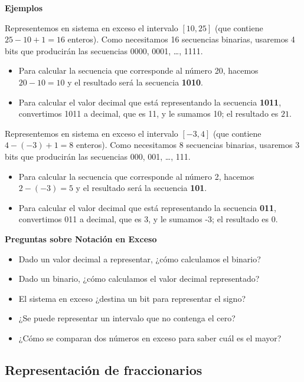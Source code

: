 \documentclass[spanish,a4paper,]{article}
\providecommand{\tightlist}{%
  \setlength{\itemsep}{0pt}\setlength{\parskip}{0pt}}
\begin{document}
\textbf{Ejemplos}

Representemos en sistema en exceso el intervalo \([10, 25]\) (que
contiene \(25 - 10 + 1 = 16\) enteros). Como necesitamos 16 secuencias
binarias, usaremos 4 bits que producirán las secuencias 0000, 0001,
\ldots{}, 1111.

\begin{itemize}
\tightlist
\item
  Para calcular la secuencia que corresponde al número 20, hacemos
  \(20 - 10 = 10\) y el resultado será la secuencia \textbf{1010}.
\item
  Para calcular el valor decimal que está representando la secuencia
  \textbf{1011}, convertimos 1011 a decimal, que es 11, y le sumamos 10;
  el resultado es \(21\).
\end{itemize}

Representemos en sistema en exceso el intervalo \([-3, 4]\) (que
contiene \(4 -(-3) + 1 = 8\) enteros). Como necesitamos 8 secuencias
binarias, usaremos 3 bits que producirán las secuencias 000, 001,
\ldots{}, 111.

\begin{itemize}
\tightlist
\item
  Para calcular la secuencia que corresponde al número 2, hacemos
  \(2 -(-3) = 5\) y el resultado será la secuencia \textbf{101}.
\item
  Para calcular el valor decimal que está representando la secuencia
  \textbf{011}, convertimos 011 a decimal, que es 3, y le sumamos -3; el
  resultado es \(0\).
\end{itemize}

\textbf{Preguntas sobre Notación en Exceso}

\begin{itemize}
\tightlist
\item
  Dado un valor decimal a representar, ¿cómo calculamos el binario?
\item
  Dado un binario, ¿cómo calculamos el valor decimal representado?
\item
  El sistema en exceso ¿destina un bit para representar el signo?
\item
  ¿Se puede representar un intervalo que no contenga el cero?
\item
  ¿Cómo se comparan dos números en exceso para saber cuál es el mayor?
\end{itemize}

\hypertarget{representaciuxf3n-de-fraccionarios}{%
\subsection{Representación de
fraccionarios}\label{representaciuxf3n-de-fraccionarios}}
\end{document}
